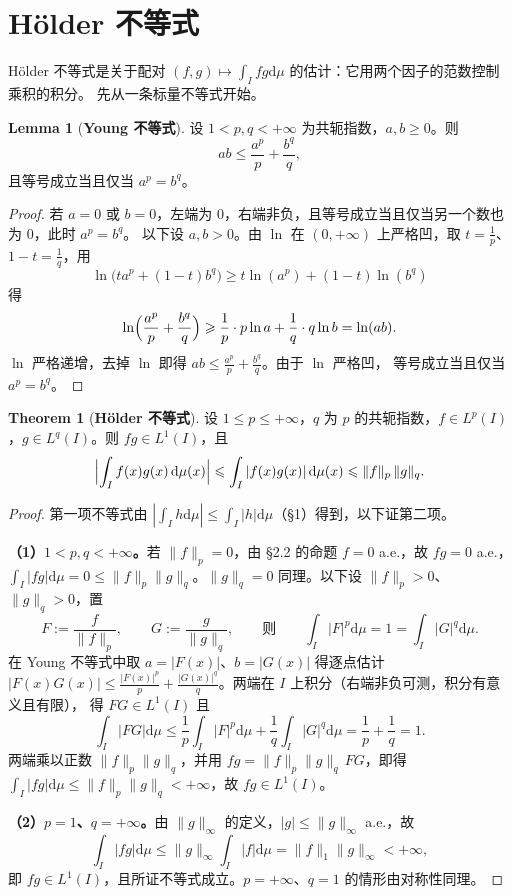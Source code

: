 \documentclass[oneside]{book}
\theoremstyle{definition}
\newcommand{\dd}{\mathrm{d}}
\theoremstyle{definition}
\newtheorem{theorem}{Theorem}[section]
\newtheorem{lemma}{Lemma}[section]
\begin{document}
	\section{Hölder 不等式}
	
	Hölder 不等式是关于配对 $(f,g)\mapsto\int_I fg\dd\mu$ 的估计：它用两个因子的范数控制乘积的积分。
	先从一条标量不等式开始。
	
	\begin{lemma}[\bfseries{Young 不等式}]
		设 $1<p,q<+\infty$ 为共轭指数，$a,b\geqslant0$。则
		\[
		ab\leqslant\frac{a^p}{p}+\frac{b^q}{q},
		\]
		且等号成立当且仅当 $a^p=b^q$。
	\end{lemma}
	
	\begin{proof}
		若 $a=0$ 或 $b=0$，左端为 $0$，右端非负，且等号成立当且仅当另一个数也为 $0$，此时 $a^p=b^q$。
		以下设 $a,b>0$。由 $\ln$ 在 $(0,+\infty)$ 上严格凹，取 $t=\frac1p$、$1-t=\frac1q$，用
		\[
		\ln\bigl(ta^p+(1-t)b^q\bigr)\geqslant t\ln(a^p)+(1-t)\ln(b^q)
		\]
		得
		\[
		\ln\Bigl(\frac{a^p}{p}+\frac{b^q}{q}\Bigr)\geqslant\frac1p\cdot p\ln a+\frac1q\cdot q\ln b=\ln(ab).
		\]
		$\ln$ 严格递增，去掉 $\ln$ 即得 $ab\leqslant\frac{a^p}{p}+\frac{b^q}{q}$。由于 $\ln$ 严格凹，
		等号成立当且仅当 $a^p=b^q$。
	\end{proof}
	
	\begin{theorem}[\bfseries{Hölder 不等式}]
		设 $1\leqslant p\leqslant+\infty$，$q$ 为 $p$ 的共轭指数，$f\in L^p(I)$，$g\in L^q(I)$。则 $fg\in L^1(I)$，且
		\[
		\Bigl|\int_I f(x)g(x)\,\dd\mu(x)\Bigr|
		\leqslant\int_I|f(x)g(x)|\,\dd\mu(x)
		\leqslant\|f\|_p\,\|g\|_q .
		\]
	\end{theorem}
	
	\begin{proof}
		第一项不等式由 $|\int_I h\dd\mu|\leqslant\int_I|h|\dd\mu$（§1）得到，以下证第二项。
		
		\textbf{（1）$1<p,q<+\infty$。}若 $\|f\|_p=0$，由 §2.2 的命题 $f=0$ a.e.，故 $fg=0$ a.e.，
		$\int_I|fg|\dd\mu=0\leqslant\|f\|_p\|g\|_q$。$\|g\|_q=0$ 同理。以下设 $\|f\|_p>0$、$\|g\|_q>0$，置
		\[
		F:=\frac{f}{\|f\|_p},\qquad G:=\frac{g}{\|g\|_q},
		\qquad\text{则}\qquad
		\int_I|F|^p\dd\mu=1=\int_I|G|^q\dd\mu .
		\]
		在 Young 不等式中取 $a=|F(x)|$、$b=|G(x)|$ 得逐点估计
		$|F(x)G(x)|\leqslant\frac{|F(x)|^p}{p}+\frac{|G(x)|^q}{q}$。两端在 $I$ 上积分（右端非负可测，积分有意义且有限），
		得 $FG\in L^1(I)$ 且
		\[
		\int_I|FG|\dd\mu\leqslant\frac1p\int_I|F|^p\dd\mu+\frac1q\int_I|G|^q\dd\mu=\frac1p+\frac1q=1 .
		\]
		两端乘以正数 $\|f\|_p\|g\|_q$，并用 $fg=\|f\|_p\|g\|_q\,FG$，即得
		$\int_I|fg|\dd\mu\leqslant\|f\|_p\|g\|_q<+\infty$，故 $fg\in L^1(I)$。
		
		\textbf{（2）$p=1$、$q=+\infty$。}由 $\|g\|_\infty$ 的定义，$|g|\leqslant\|g\|_\infty$ a.e.，故
		\[
		\int_I|f g|\dd\mu\leqslant\|g\|_\infty\int_I|f|\dd\mu=\|f\|_1\|g\|_\infty<+\infty,
		\]
		即 $fg\in L^1(I)$，且所证不等式成立。$p=+\infty$、$q=1$ 的情形由对称性同理。
	\end{proof}
	
\end{document}
